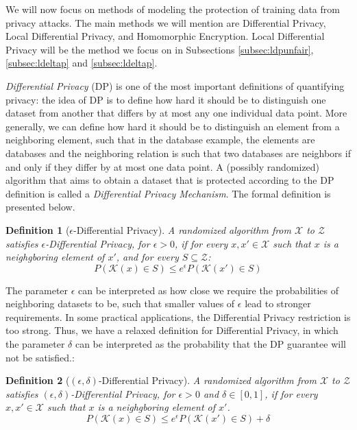 \documentclass[conference]{IEEEtran}
\newtheorem{definition}{Definition}
\begin{document}
We will now focus on methods of modeling the protection of training data from privacy attacks. The main methods we will mention are Differential Privacy, Local Differential Privacy, and Homomorphic Encryption. Local Differential Privacy will be the method we focus on in Subsections \ref{subsec:ldpunfair}, \ref{subsec:ldeltap} and \ref{subsec:ldeltap}.

\emph{Differential Privacy} (DP) is one of the most important definitions of quantifying privacy: the idea of DP is to define how hard it should be to distinguish one dataset from another that differs by at most any one individual data point. More generally, we can define how hard it should be to distinguish an element from a neighboring element, such that in the database example, the elements are databases and the neighboring relation is such that two databases are neighbors if and only if they differ by at most one data point. A (possibly randomized) algorithm that aims to obtain a dataset that is protected according to the DP definition is called a \emph{Differential Privacy Mechanism}. The formal definition is presented below. 

\begin{definition}[$\epsilon$-Differential Privacy]\label{def:epsilonLDP} A randomized algorithm from $\mathcal{X}$ to $\mathcal{Z}$ satisfies $\epsilon$-Differential Privacy, for $\epsilon > 0$, if for every $x,x' \in \mathcal{X}$ such that $x$ is a neighgboring element of $x'$, and for every $S \subseteq \mathcal{Z}$:
$$P(\mathcal{K}(x) \in S) \leq e^\epsilon P(\mathcal{K}(x')\in S)$$
\end{definition}

The parameter $\epsilon$ can be interpreted as how close we require the probabilities of neighboring datasets to be, such that smaller values of $\epsilon$ lead to stronger requirements. In some practical applications, the Differential Privacy restriction is too strong. Thus, we have a relaxed definition for Differential Privacy, in which the parameter $\delta$ can be interpreted as the probability that the DP guarantee will not be satisfied.:

\begin{definition}[$(\epsilon,\delta)$-Differential Privacy] A randomized algorithm from $\mathcal{X}$ to $\mathcal{Z}$ satisfies $(\epsilon,\delta)$-Differential Privacy, for $\epsilon > 0$ and $\delta \in [0,1]$, if for every $x,x' \in \mathcal{X}$ such that $x$ is a neighgboring element of $x'$.
$$P(\mathcal{K}(x) \in S) \leq e^\epsilon P(\mathcal{K}(x')\in S)+\delta$$
\end{definition}
\end{document}
